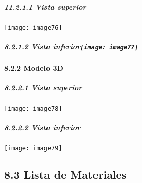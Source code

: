 \documentclass{article} %
\begin{document}
\noindent 
\subparagraph{11.2.1.1 Vista superior}

\noindent \texttt{[image: image76]}

\noindent 

\noindent 
\subparagraph{8.2.1.2 Vista inferior\texttt{[image: image77]}\eject }

\noindent 
\paragraph{8.2.2 Modelo 3D}

\noindent 
\subparagraph{8.2.2.1 Vista superior}

\noindent \texttt{[image: image78]}

\noindent 
\subparagraph{8.2.2.2 Vista inferior}

\noindent \texttt{[image: image79]}\eject 

\noindent 
\subsection{8.3 Lista de Materiales}

\noindent 
\end{document}
